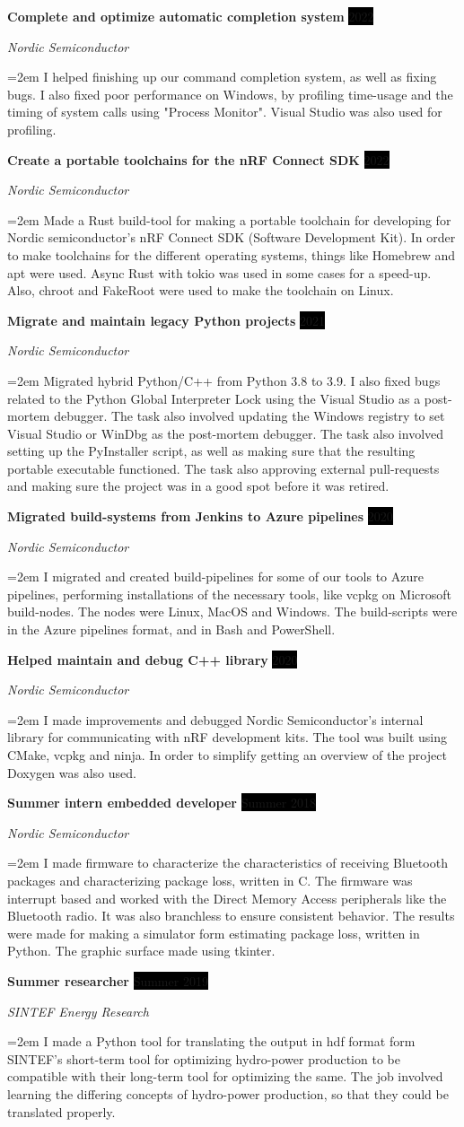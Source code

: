 \documentclass[paper=a4,fontsize=11pt,norsk]{scrartcl} %
\newcommand{\EducationEntry}[4]{
		\noindent \textbf{#1} \hfill      %
		\colorbox{Black}{%
			\parbox{6em}{%
			\hfill\color{White}#2}} \par  %
		\noindent \textit{#3} \par        %
		\noindent\hangindent=2em\hangafter=0 \small #4 %
		\normalsize \par}
\newcommand{\WorkEntry}[4]{				  %
		\noindent \textbf{#1} \hfill      %
		\colorbox{Black}{\color{White}#2} \par  %
		\noindent \textit{#3} \par              %
		\noindent\hangindent=2em\hangafter=0 \small #4 %
		\normalsize \par}
\begin{document}
\WorkEntry{Complete and optimize automatic completion system}{2022}{Nordic Semiconductor} { I helped finishing up our command completion system, as well as fixing bugs. I also fixed poor performance on Windows, by profiling time-usage and the timing of system calls using "Process Monitor". Visual Studio was also used for profiling. }
\WorkEntry{Create a portable toolchains for the nRF Connect SDK}{2022}{Nordic Semiconductor} { Made a Rust build-tool for making a portable toolchain for developing for Nordic semiconductor's nRF Connect SDK (Software Development Kit). In order to make toolchains for the different operating systems, things like Homebrew and apt were used. Async Rust with tokio was used in some cases for a speed-up. Also, chroot and FakeRoot were used to make the toolchain on Linux. }
\WorkEntry{Migrate and maintain legacy Python projects}{2021}{Nordic Semiconductor} {Migrated hybrid Python/C++ from Python 3.8 to 3.9. I also fixed bugs related to the Python Global Interpreter Lock using the Visual Studio as a post-mortem debugger. The task also involved updating the Windows registry to set Visual Studio or WinDbg as the post-mortem debugger. The task also involved setting up the PyInstaller script, as well as making sure that the resulting portable executable functioned. The task also approving external pull-requests and making sure the project was in a good spot before it was retired. }
\WorkEntry{Migrated build-systems from Jenkins to Azure pipelines}{2020}{Nordic Semiconductor} {I migrated and created build-pipelines for some of our tools to Azure pipelines, performing installations of the necessary tools, like vcpkg on Microsoft build-nodes. The nodes were Linux, MacOS and Windows. The build-scripts were in the Azure pipelines format, and in Bash and PowerShell. }
\WorkEntry{Helped maintain and debug C++ library}{2020}{Nordic Semiconductor} { I made improvements and debugged Nordic Semiconductor's internal library for communicating with nRF development kits. The tool was built using CMake, vcpkg and ninja. In order to simplify getting an overview of the project Doxygen was also used. }
\WorkEntry{Summer intern embedded developer}{Summer 2018}{Nordic Semiconductor} {I made firmware to characterize the characteristics of receiving Bluetooth packages and characterizing package loss, written in C. The firmware was interrupt based and worked with the Direct Memory Access peripherals like the Bluetooth radio. It was also branchless to ensure consistent behavior. The results were made for making a simulator form estimating package loss, written in Python. The graphic surface made using tkinter. }
\WorkEntry{Summer researcher}{Summer 2019}{SINTEF Energy Research} { I made a Python tool for translating the output in hdf format form SINTEF's short-term tool for optimizing hydro-power production to be compatible with their long-term tool for optimizing the same. The job involved learning the differing concepts of hydro-power production, so that they could be translated properly. }
\end{document}
